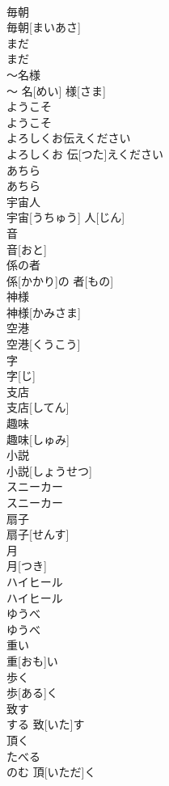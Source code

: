 \documentclass[8pt]{extreport}
\begin{document}
\begin{CJK}{UTF8}{min}
\\	毎朝	
\\	毎朝[まいあさ]
\\	まだ	
\\	まだ
\\	〜名様	
\\	〜 名[めい] 様[さま]
\\	ようこそ	
\\	ようこそ
\\	よろしくお伝えください	
\\	よろしくお 伝[つた]えください
\\	あちら	
\\	あちら
\\	宇宙人	
\\	宇宙[うちゅう] 人[じん]
\\	音	
\\	音[おと]
\\	係の者	
\\	係[かかり]の 者[もの]
\\	神様	
\\	神様[かみさま]
\\	空港	
\\	空港[くうこう]
\\	字	
\\	字[じ]
\\	支店	
\\	支店[してん]
\\	趣味	
\\	趣味[しゅみ]
\\	小説	
\\	小説[しょうせつ]
\\	スニーカー	
\\	スニーカー
\\	扇子	
\\	扇子[せんす]
\\	月	
\\	月[つき]
\\	ハイヒール	
\\	ハイヒール
\\	ゆうべ	
\\	ゆうべ
\\	重い	
\\	重[おも]い
\\	歩く	
\\	歩[ある]く
\\	致す	
\\	する	致[いた]す
\\	頂く	
\\	たべる 
\\	のむ	頂[いただ]く

\end{CJK}
\end{document}
